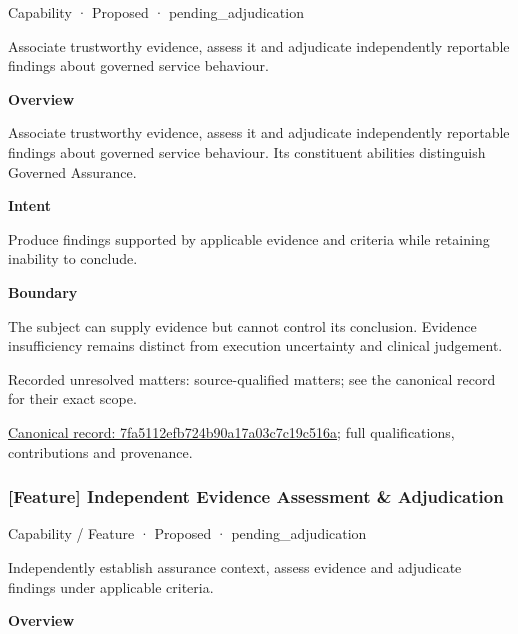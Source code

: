 \label{element:7fa5112efb724b90a17a03c7c19c516a}
{\small Capability · Proposed · pending\_adjudication}\par

Associate trustworthy evidence, assess it and adjudicate independently reportable findings about governed service behaviour.



\textbf{Overview}



Associate trustworthy evidence, assess it and adjudicate independently reportable findings about governed service behaviour. Its constituent abilities distinguish Governed Assurance.



\textbf{Intent}



Produce findings supported by applicable evidence and criteria while retaining inability to conclude.



\textbf{Boundary}



The subject can supply evidence but cannot control its conclusion. Evidence insufficiency remains distinct from execution uncertainty and clinical judgement.


{\small Recorded unresolved matters: source-qualified matters; see the canonical record for their exact scope.}\par
{\footnotesize \href{../../../../continuum/strategy/capability/7fa5112efb724b90a17a03c7c19c516a.md}{Canonical record: 7fa5112efb724b90a17a03c7c19c516a}; full qualifications, contributions and provenance.}\par
\subsubsection{[Feature] Independent Evidence Assessment \& Adjudication}

\label{element:3aedee8f78484b81955866bcf16b8a6d}
{\small Capability / Feature · Proposed · pending\_adjudication}\par

Independently establish assurance context, assess evidence and adjudicate findings under applicable criteria.



\textbf{Overview}



